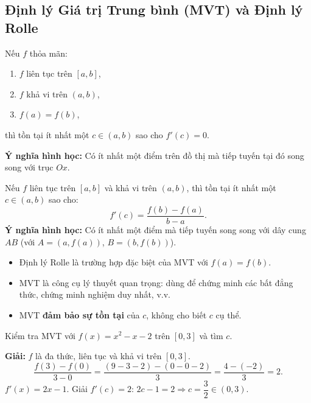 \documentclass[12pt,a4paper]{article}
\begin{document}
\subsection{Định lý Giá trị Trung bình (MVT) và Định lý Rolle}

\begin{dinhly}[title={Định lý Rolle}]
  Nếu $f$ thỏa mãn:
  \begin{enumerate}[label=(\roman*)]
    \item $f$ liên tục trên $[a, b]$,
    \item $f$ khả vi trên $(a, b)$,
    \item $f(a) = f(b)$,
  \end{enumerate}
  thì tồn tại ít nhất một $c \in (a, b)$ sao cho $f'(c) = 0$.

  \medskip
  \textbf{Ý nghĩa hình học:} Có ít nhất một điểm trên đồ thị mà tiếp tuyến tại đó song song với trục $Ox$.
\end{dinhly}

\begin{dinhly}[title={Định lý Giá trị Trung bình (MVT -- Mean Value Theorem)}]
  Nếu $f$ liên tục trên $[a, b]$ và khả vi trên $(a, b)$, thì tồn tại ít nhất một $c \in (a, b)$ sao cho:
  \[
    f'(c) = \frac{f(b) - f(a)}{b - a}.
  \]
  \textbf{Ý nghĩa hình học:} Có ít nhất một điểm mà tiếp tuyến song song với dây cung $AB$ (với $A = (a, f(a))$, $B = (b, f(b))$).
\end{dinhly}

\begin{luuy}
  \begin{itemize}
    \item Định lý Rolle là trường hợp đặc biệt của MVT với $f(a) = f(b)$.
    \item MVT là công cụ lý thuyết quan trọng: dùng để chứng minh các bất đẳng thức, chứng minh nghiệm duy nhất, v.v.
    \item MVT \textbf{đảm bảo sự tồn tại} của $c$, không cho biết $c$ cụ thể.
  \end{itemize}
\end{luuy}

\begin{vidu}
  Kiểm tra MVT với $f(x) = x^2 - x - 2$ trên $[0, 3]$ và tìm $c$.

  \medskip\textbf{Giải:}
  $f$ là đa thức, liên tục và khả vi trên $[0, 3]$.
  \[
    \frac{f(3) - f(0)}{3 - 0} = \frac{(9 - 3 - 2) - (0 - 0 - 2)}{3} = \frac{4 - (-2)}{3} = 2.
  \]
  $f'(x) = 2x - 1$. Giải $f'(c) = 2$: $2c - 1 = 2 \Rightarrow c = \dfrac{3}{2} \in (0, 3)$.
\end{vidu}
\end{document}
